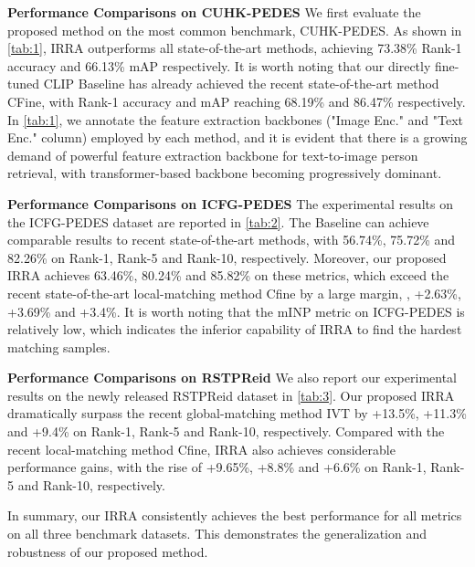 \documentclass[10pt,twocolumn,letterpaper]{article}
\begin{document}
\textbf{Performance Comparisons on CUHK-PEDES}
We first evaluate the proposed method on the most common benchmark, CUHK-PEDES. As shown in \cref{tab:1}, IRRA outperforms all state-of-the-art methods, achieving 73.38\% Rank-1 accuracy and 66.13\% mAP respectively. It is worth noting that our directly fine-tuned CLIP Baseline has already achieved the recent state-of-the-art method CFine\cite{yan2022clip}, with Rank-1 accuracy and mAP reaching 68.19\% and 86.47\% respectively.
In \cref{tab:1}, we annotate the feature extraction backbones ("Image Enc." and "Text Enc." column) employed by each method, and it is evident that there is a  growing demand of powerful feature extraction backbone for text-to-image person retrieval, with transformer-based backbone becoming progressively dominant. 

\textbf{Performance Comparisons on ICFG-PEDES}
The experimental results on the ICFG-PEDES dataset are reported in \cref{tab:2}. The Baseline can achieve comparable results to recent state-of-the-art methods, with 56.74\%, 75.72\% and 82.26\% on Rank-1, Rank-5 and Rank-10, respectively. Moreover, our proposed IRRA achieves 63.46\%, 80.24\% and 85.82\% on these metrics, which exceed the recent state-of-the-art local-matching method Cfine\cite{yan2022clip} by a large margin, \ie, +2.63\%, +3.69\% and +3.4\%. It is worth noting that the mINP\cite{ye2021deep} metric on ICFG-PEDES is relatively low, which indicates the inferior capability of IRRA to find the hardest matching samples.

\textbf{Performance Comparisons on RSTPReid}
We also report our experimental results on the newly released RSTPReid dataset in \cref{tab:3}. Our proposed IRRA dramatically surpass the recent global-matching method IVT\cite{shu2022see} by +13.5\%, +11.3\% and +9.4\% on Rank-1, Rank-5 and Rank-10, respectively. Compared with the recent local-matching method Cfine\cite{yan2022clip}, IRRA also achieves considerable performance gains, with the rise of +9.65\%, +8.8\% and +6.6\% on Rank-1, Rank-5 and Rank-10, respectively.

In summary, our IRRA consistently achieves the best performance for all metrics on all three benchmark datasets. This demonstrates the generalization and robustness of our proposed method.
\end{document}
